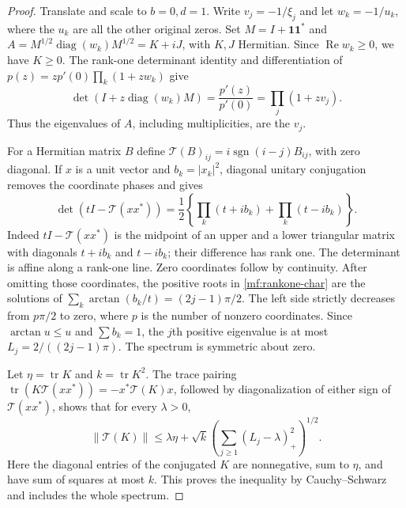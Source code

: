\documentclass[11pt,reqno]{amsart}
\numberwithin{equation}{section}
\theoremstyle{definition}
\theoremstyle{remark}
\DeclareMathOperator{\tr}{tr}
\DeclareMathOperator{\diag}{diag}
\renewcommand{\Re}{\operatorname{Re}}
\begin{document}
\begin{proof}
Translate and scale to $b=0,d=1$. Write $v_j=-1/\xi_j$ and let
$w_k=-1/u_k$, where the $u_k$ are all the other original zeros.
Set $M=I+\mathbf1\mathbf1^*$ and
$A=M^{1/2}\diag(w_k)M^{1/2}=K+iJ$, with $K,J$ Hermitian.
Since $\Re w_k\ge0$, we have $K\ge0$. The rank-one determinant
identity and differentiation of $p(z)=zp'(0)\prod_k(1+zw_k)$ give
\[
 \det(I+z\diag(w_k)M)=\frac{p'(z)}{p'(0)}
                    =\prod_j(1+zv_j).
\]
Thus the eigenvalues of $A$, including multiplicities, are the $v_j$.

For a Hermitian matrix $B$ define
$\mathcal T(B)_{ij}=i\operatorname{sgn}(i-j)B_{ij}$, with zero
diagonal. If $x$ is a unit vector and $b_k=|x_k|^2$, diagonal
unitary conjugation removes the coordinate phases and gives
\begin{equation}\label{mf:rankone-char}
 \det(tI-\mathcal T(xx^*))
 =\frac12\left\{\prod_k(t+ib_k)+\prod_k(t-ib_k)\right\}.
\end{equation}
Indeed $tI-\mathcal T(xx^*)$ is the midpoint of an upper and a
lower triangular matrix with diagonals $t+ib_k$ and $t-ib_k$;
their difference has rank one. The determinant is affine along
a rank-one line. Zero coordinates follow by continuity.
After omitting those coordinates, the positive roots in
\eqref{mf:rankone-char} are the solutions of
$\sum_k\arctan(b_k/t)=(2j-1)\pi/2$. The left side strictly
decreases from $p\pi/2$ to zero, where $p$ is the number of
nonzero coordinates. Since $\arctan u\le u$ and $\sum b_k=1$,
the $j$th positive eigenvalue is at most
$L_j=2/((2j-1)\pi)$. The spectrum is symmetric about zero.

Let $\eta=\tr K$ and $k=\tr K^2$. The trace pairing
$\tr(K\mathcal T(xx^*))=-x^*\mathcal T(K)x$, followed by
diagonalization of either sign of $\mathcal T(xx^*)$, shows that
for every $\lambda>0$,
\begin{equation}\label{mf:schur-pair}
 \|\mathcal T(K)\|
 \le\lambda\eta+\sqrt{k}
       \left(\sum_{j\ge1}(L_j-\lambda)_+^2\right)^{1/2}.
\end{equation}
Here the diagonal entries of the conjugated $K$ are nonnegative,
sum to $\eta$, and have sum of squares at most $k$. This proves
the inequality by Cauchy--Schwarz and includes the whole spectrum.


\end{proof}
\end{document}
